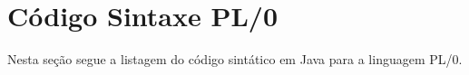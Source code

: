 \section{Código Sintaxe PL/0}

Nesta seção segue a listagem do código sintático em Java para a linguagem PL/0.
\newline


